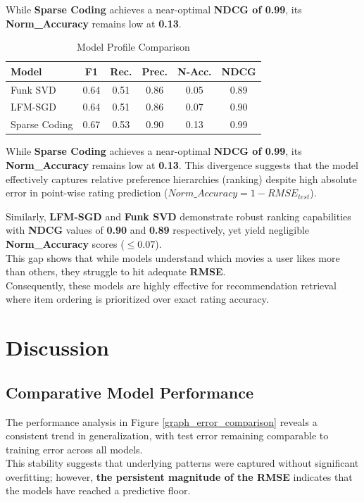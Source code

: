 \documentclass[conference]{IEEEtran}
\begin{document}
While \textbf{Sparse Coding} achieves a near-optimal \textbf{NDCG of 0.99}, its \textbf{Norm\_Accuracy} remains low at \textbf{0.13}.

\begin{table}[h]
	\centering
	\caption{Model Profile Comparison}
	\label{tab:model_profile_comparison}
	\footnotesize 
	\setlength{\tabcolsep}{2.5pt} 
	\begin{tabular}{|l|ccccc|}
		\hline
		\textbf{Model} & \textbf{F1} & \textbf{Rec.} & \textbf{Prec.} & \textbf{N-Acc.} & \textbf{NDCG} \\ \hline
		Funk SVD       & 0.64  & 0.51  & 0.86  & 0.05  & 0.89  \\
		LFM-SGD        & 0.64  & 0.51  & 0.86  & 0.07  & 0.90  \\
		Sparse Coding  & 0.67  & 0.53  & 0.90  & 0.13  & 0.99  \\ \hline
	\end{tabular}
\end{table}
\vspace{8mm}
While \textbf{Sparse Coding} achieves a near-optimal \textbf{NDCG of 0.99}, its \textbf{Norm\_Accuracy} remains low at \textbf{0.13}.
\indent This divergence suggests that the model effectively captures relative preference hierarchies (ranking) despite high absolute error in point-wise rating prediction ($Norm\_Accuracy = 1 - RMSE_{test}$).

Similarly, \textbf{LFM-SGD} and \textbf{Funk SVD} demonstrate robust ranking capabilities with \textbf{NDCG} values of \textbf{0.90} and \textbf{0.89} respectively, yet yield negligible \textbf{Norm\_Accuracy} scores ($\le 0.07$).\\
\indent This gap shows that while models understand which movies a user likes more than others, they struggle to hit adequate \textbf{RMSE}.\\ 
\indent Consequently, these models are highly effective for recommendation retrieval where item ordering is prioritized over exact rating accuracy.


\section{\textbf{Discussion}}

\subsection{\textbf{Comparative Model Performance}}

The performance analysis in Figure \ref{graph_error_comparison} reveals a consistent trend in generalization, with test error remaining comparable to training error across all models.\\
\indent This stability suggests that underlying patterns were captured without significant overfitting; however, \textbf{the persistent magnitude of the RMSE} indicates that the models have reached a predictive floor.
\end{document}
